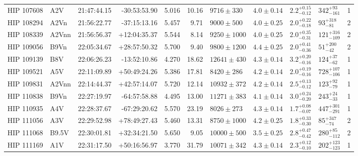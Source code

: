 \begin{landscape}
\begin{scriptsize}
\begin{longtable}{|l|lrrrrlllll|}
  HIP 107608 &      A2V &    21:47:44.15 &   -30:53:53.90 &   5.016 &     10.16 &    $9716 \pm 330$ &  $4.0 \pm 0.14$ &  $2.2^{+0.15}_{-0.12}$ &    $342^{+93}_{-161}$ &       1 \\
  HIP 108294 &     A2Vn &    21:56:22.77 &   -37:15:13.16 &   5.457 &      9.71 &    $9000 \pm 500$ &  $4.0 \pm 0.25$ &  $2.0^{+0.22}_{-0.18}$ &     $93^{+318}_{-81}$ &       2 \\
  HIP 108339 &    A2Vnn &    21:56:56.37 &   +12:04:35.37 &   5.544 &      8.14 &   $9250 \pm 1000$ &  $4.0 \pm 0.25$ &  $2.0^{+0.35}_{-0.31}$ &   $121^{+316}_{-109}$ &       2 \\
  HIP 109056 &     B9Vn &    22:05:34.67 &   +28:57:50.32 &   5.700 &      9.40 &   $9800 \pm 1200$ &  $4.4 \pm 0.25$ &  $2.0^{+0.41}_{-0.36}$ &     $51^{+200}_{-42}$ &       2 \\
  HIP 109139 &      B8V &    22:06:26.23 &   -13:52:10.86 &   4.270 &     18.62 &   $12641 \pm 430$ &  $4.3 \pm 0.14$ &  $3.2^{+0.20}_{-0.16}$ &     $124^{+37}_{-62}$ &       1 \\
  HIP 109521 &      A5V &    22:11:09.89 &   +50:49:24.26 &   5.386 &     17.81 &    $8420 \pm 286$ &  $4.2 \pm 0.14$ &  $2.0^{+0.19}_{-0.16}$ &   $728^{+107}_{-106}$ &       1 \\
  HIP 109831 &    A2Vnn &    22:14:44.37 &   +42:57:14.07 &   5.720 &     12.14 &   $10932 \pm 372$ &  $4.2 \pm 0.14$ &  $2.5^{+0.13}_{-0.12}$ &     $123^{+92}_{-79}$ &       1 \\
  HIP 110838 &     B9Vn &    22:27:19.97 &   -64:57:58.88 &   4.495 &     13.00 &   $11271 \pm 383$ &  $4.1 \pm 0.14$ &  $3.0^{+0.24}_{-0.20}$ &     $243^{+24}_{-33}$ &       1 \\
  HIP 110935 &      A4V &    22:28:37.67 &   -67:29:20.62 &   5.570 &     23.19 &    $8026 \pm 273$ &  $4.3 \pm 0.14$ &  $1.7^{+0.08}_{-0.07}$ &   $447^{+301}_{-291}$ &       1 \\
  HIP 111056 &      A3V &    22:29:52.98 &   +78:49:27.43 &   5.460 &     13.31 &   $8750 \pm 1000$ &  $4.2 \pm 0.25$ &  $1.8^{+0.33}_{-0.30}$ &     $85^{+347}_{-74}$ &       2 \\
  HIP 111068 &    B9.5V &    22:30:01.81 &   +32:34:21.50 &   5.650 &      9.05 &   $10000 \pm 500$ &  $3.5 \pm 0.25$ &  $2.8^{+0.47}_{-0.42}$ &    $280^{+85}_{-112}$ &       2 \\
  HIP 111169 &      A1V &    22:31:17.50 &   +50:16:56.97 &   3.770 &     31.79 &   $10071 \pm 342$ &  $4.3 \pm 0.14$ &  $2.3^{+0.12}_{-0.10}$ &   $202^{+123}_{-123}$ &       1 \\

\end{longtable}
\end{scriptsize}
\end{landscape}
